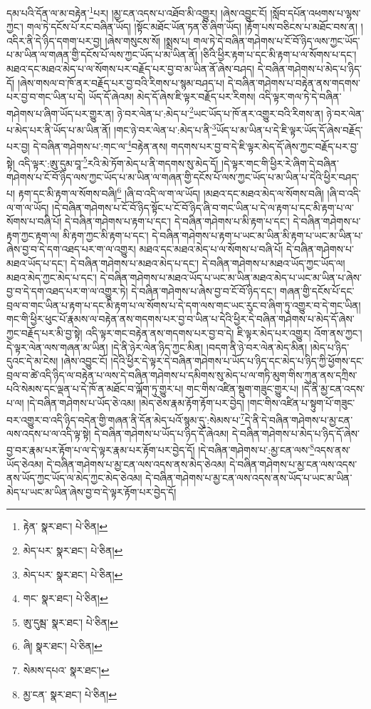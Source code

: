 དམ་པའི་དོན་ལ་མ་བརྟེན་\footnote{རྟེན་  སྣར་ཐང་།  པེ་ཅིན། }པར། །མྱ་ངན་འདས་པ་འཐོབ་མི་འགྱུར། །ཞེས་འབྱུང་ངོ། །སློབ་དཔོན་འཕགས་པ་ལྷས་ཀྱང་། གལ་ཏེ་དངོས་པོ་རང་བཞིན་ཡོད། །སྟོང་མཐོང་ཡོན་ཏན་ཅི་ཞིག་ཡོད། །རྟོག་པས་བཅིངས་པ་མཐོང་བས་ན། །འདིར་ནི་དེ་ཉིད་དགག་པར་བྱ། །ཞེས་གསུངས་སོ། །སྨྲས་པ། གལ་ཏེ་དེ་བཞིན་གཤེགས་པ་ངོ་བོ་ཉིད་ལས་ཀྱང་ཡོད་པ་མ་ཡིན་ལ་གཞན་གྱི་དངོས་པོ་ལས་ཀྱང་ཡོད་པ་མ་ཡིན་ནོ། །ཅིའི་ཕྱིར་རྟག་པ་དང་མི་རྟག་པ་ལ་སོགས་པ་དང་། མཐའ་དང་མཐའ་མེད་པ་ལ་སོགས་པར་བརྗོད་པར་བྱ་བ་མ་ཡིན་ནོ་ཞེས་བཤད། དེ་བཞིན་གཤེགས་པ་མེད་པ་ཉིད་དོ། །ཞེས་གསལ་བ་ཁོ་ནར་བརྗོད་པར་བྱ་བའི་རིགས་པ་སྙམ་བཤད་པ། དེ་བཞིན་གཤེགས་པ་བརྟེན་ནས་གདགས་པར་བྱ་བ་གང་ཡིན་པ་དེ། ཡོད་དོ་ཞེའམ། མེད་དོ་ཞེས་ཇི་ལྟར་བརྗོད་པར་རིགས། འདི་ལྟར་གལ་ཏེ་དེ་བཞིན་གཤེགས་པ་ཞིག་ཡོད་པར་གྱུར་ན། ཉེ་བར་ལེན་པ་:མེད་པ་\footnote{མེད་པར་  སྣར་ཐང་།  པེ་ཅིན། }ཡང་ཡོད་པ་ཁོ་ནར་འགྱུར་བའི་རིགས་ན། ཉེ་བར་ལེན་པ་མེད་པར་ནི་ཡོད་པ་མ་ཡིན་ནོ། །གང་ཉེ་བར་ལེན་པ་:མེད་པ་ནི་\footnote{མེད་པར་  སྣར་ཐང་།  པེ་ཅིན། }ཡོད་པ་མ་ཡིན་པ་དེ་ཇི་ལྟར་ཡོད་དོ་ཞེས་བརྗོད་པར་བྱ། དེ་བཞིན་གཤེགས་པ་:གང་ལ་\footnote{གང་  སྣར་ཐང་།  པེ་ཅིན། }བརྟེན་ནས། གདགས་པར་བྱ་བ་དེ་ཇི་ལྟར་མེད་དོ་ཞེས་ཀྱང་བརྗོད་པར་བྱ་སྟེ། འདི་ལྟར་:ཨུ་དུམ་བཱ་\footnote{ཨུ་དུམྦ་  སྣར་ཐང་།  པེ་ཅིན། }རའི་མེ་ཏོག་མེད་པ་ནི་གདགས་སུ་མེད་དོ། །དེ་ལྟར་གང་གི་ཕྱིར་རེ་ཞིག་དེ་བཞིན་གཤེགས་པ་ངོ་བོ་ཉིད་ལས་ཀྱང་ཡོད་པ་མ་ཡིན་ལ་གཞན་གྱི་དངོས་པོ་ལས་ཀྱང་ཡོད་པ་མ་ཡིན་པ་དེའི་ཕྱིར་བཤད་པ། རྟག་དང་མི་རྟག་ལ་སོགས་བཞི།\footnote{ཞི།  སྣར་ཐང་།  པེ་ཅིན། } །ཞི་བ་འདི་ལ་ག་ལ་ཡོད། །མཐའ་དང་མཐའ་མེད་ལ་སོགས་བཞི། །ཞི་བ་འདི་ལ་ག་ལ་ཡོད། །དེ་བཞིན་གཤེགས་པ་ངོ་བོ་ཉིད་སྟོང་པ་ངོ་བོ་ཉིད་ཞི་བ་གང་ཡིན་པ་དེ་ལ་རྟག་པ་དང་མི་རྟག་པ་ལ་སོགས་པ་བཞི་པོ། དེ་བཞིན་གཤེགས་པ་རྟག་པ་དང་། དེ་བཞིན་གཤེགས་པ་མི་རྟག་པ་དང་། དེ་བཞིན་གཤེགས་པ་རྟག་ཀྱང་རྟག་ལ། མི་རྟག་ཀྱང་མི་རྟག་པ་དང་། དེ་བཞིན་གཤེགས་པ་རྟག་པ་ཡང་མ་ཡིན་མི་རྟག་པ་ཡང་མ་ཡིན་པ་ཞེས་བྱ་བ་དེ་དག་འཐད་པར་ག་ལ་འགྱུར། མཐའ་དང་མཐའ་མེད་པ་ལ་སོགས་པ་བཞི་པོ། དེ་བཞིན་གཤེགས་པ་མཐའ་ཡོད་པ་དང་། དེ་བཞིན་གཤེགས་པ་མཐའ་མེད་པ་དང་། དེ་བཞིན་གཤེགས་པ་མཐའ་ཡོད་ཀྱང་ཡོད་ལ། མཐའ་མེད་ཀྱང་མེད་པ་དང་། དེ་བཞིན་གཤེགས་པ་མཐའ་ཡོད་པ་ཡང་མ་ཡིན་མཐའ་མེད་པ་ཡང་མ་ཡིན་པ་ཞེས་བྱ་བ་དེ་དག་འཐད་པར་ག་ལ་འགྱུར་ཏེ། དེ་བཞིན་གཤེགས་པ་ཞེས་བྱ་བ་ངོ་བོ་ཉིད་དང་། གཞན་གྱི་དངོས་པོ་དང་བྲལ་བ་གང་ཡིན་པ་རྟག་པ་དང་མི་རྟག་པ་ལ་སོགས་པ་དེ་དག་ལས་གང་ཡང་རུང་བ་ཞིག་ཏུ་འགྱུར་བ་དེ་གང་ཡིན། གང་གི་ཕྱིར་ཕུང་པོ་རྣམས་ལ་བརྟེན་ནས་གདགས་པར་བྱ་བ་ཡིན་པ་དེའི་ཕྱིར་དེ་བཞིན་གཤེགས་པ་མེད་དོ་ཞེས་ཀྱང་བརྗོད་པར་མི་བྱ་སྟེ། འདི་ལྟར་གང་བརྟེན་ནས་གདགས་པར་བྱ་བ་དེ། ཇི་ལྟར་མེད་པར་འགྱུར། འོག་ནས་ཀྱང་། དེ་ལྟར་ལེན་ལས་གཞན་མ་ཡིན། །དེ་ནི་ཉེར་ལེན་ཉིད་ཀྱང་མིན། །བདག་ནི་ཉེ་བར་ལེན་མེད་མིན། །མེད་པ་ཉིད་དུའང་དེ་མ་ངེས། །ཞེས་འབྱུང་ངོ། །དེའི་ཕྱིར་དེ་ལྟར་དེ་བཞིན་གཤེགས་པ་ཡོད་པ་ཉིད་དང་མེད་པ་ཉིད་ཀྱི་ཕྱོགས་དང་བྲལ་བ་ཚེ་འདི་ཉིད་ལ་བརྟེན་པ་ལས་དེ་བཞིན་གཤེགས་པ་དམིགས་སུ་མེད་པ་ལ་གཏི་མུག་གིས་ཀུན་ནས་དཀྲིས་པའི་སེམས་དང་ལྡན་པ་དེ་ཁོ་ན་མཐོང་བ་ལྐོག་ཏུ་གྱུར་པ། གང་གིས་འཛིན་སྡུག་གཟུང་གྱུར་པ། །དེ་ནི་མྱ་ངན་འདས་པ་ལ། །དེ་བཞིན་གཤེགས་པ་ཡོད་ཅེ་འམ། །མེད་ཅེས་རྣམ་རྟོག་རྟོག་པར་བྱེད། །གང་གིས་འཛིན་པ་སྟུག་པོ་གཟུང་བར་འགྱུར་བ་འདི་ཉིད་བདེན་གྱི་གཞན་ནི་དོན་མེད་པའོ་སྙམ་དུ་:སེམས་པ་\footnote{སེམས་དཔའ་  སྣར་ཐང་། }དེ་ནི་དེ་བཞིན་གཤེགས་པ་མྱ་ངན་ལས་འདས་པ་ལ་འདི་ལྟ་སྟེ། དེ་བཞིན་གཤེགས་པ་ཡོད་པ་ཉིད་དོ་ཞེའམ། དེ་བཞིན་གཤེགས་པ་མེད་པ་ཉིད་དོ་ཞེས་བྱ་བར་རྣམ་པར་རྟོག་པ་ལ་དེ་ལྟར་རྣམ་པར་རྟོག་པར་བྱེད་དོ། །དེ་བཞིན་གཤེགས་པ་:མྱ་ངན་ལས་\footnote{མྱ་ངན་  སྣར་ཐང་།  པེ་ཅིན། }འདས་ནས་ཡོད་ཅེའམ། དེ་བཞིན་གཤེགས་པ་མྱ་ངན་ལས་འདས་ནས་མེད་ཅེའམ། དེ་བཞིན་གཤེགས་པ་མྱ་ངན་ལས་འདས་ནས་ཡོད་ཀྱང་ཡོད་ལ་མེད་ཀྱང་མེད་ཅེའམ། དེ་བཞིན་གཤེགས་པ་མྱ་ངན་ལས་འདས་ནས་ཡོད་པ་ཡང་མ་ཡིན་མེད་པ་ཡང་མ་ཡིན་ཞེས་བྱ་བ་དེ་ལྟར་རྟོག་པར་བྱེད་དོ། 